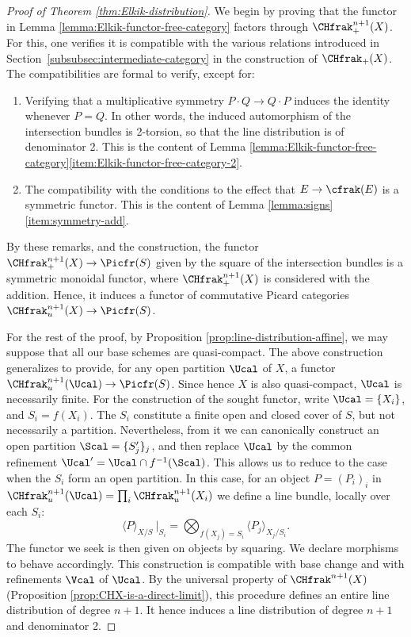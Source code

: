 \begin{proof}[Proof of Theorem \ref{thm:Elkik-distribution}]
We begin by proving that the functor in Lemma \ref{lemma:Elkik-functor-free-category} factors through $\CHfrak_{+}^{n+1}(X)$. For this, one verifies it is compatible with the various relations introduced in Section~\ref{subsubsec:intermediate-category} in the construction of $\CHfrak_{+}(X)$. The compatibilities are formal to verify, except for:
\begin{enumerate}
\item Verifying that a multiplicative symmetry $P\cdot Q\to Q\cdot P$ induces the identity whenever $P = Q$. In other words, the induced automorphism of the intersection bundles is 2-torsion, so that the line distribution is of denominator 2. This is the content of Lemma \ref{lemma:Elkik-functor-free-category}\eqref{item:Elkik-functor-free-category-2}.
\item The compatibility with the conditions to the effect that $E\to\cfrak(E)$ is a symmetric functor. This is the content of Lemma \ref{lemma:signs}\eqref{item:symmetry-add}.
\end{enumerate}
By these remarks, and the construction, the functor $\CHfrak_{+}^{n+1}(X)\to\Picfr(S)$ given by the square of the intersection bundles is a symmetric monoidal functor, where $\CHfrak_{+}^{n+1}(X)$ is considered with the addition. Hence, it induces a functor of commutative Picard categories $\CHfrak_{u}^{n+1}(X)\to\Picfr(S)$.

For the rest of the proof, by Proposition \ref{prop:line-distribution-affine}, we may suppose that all our base schemes are quasi-compact. The above construction generalizes to provide, for any open partition $\Ucal$ of $X$, a functor $\CHfrak_{u}^{n+1}(\Ucal)\to\Picfr(S)$. Since hence $X$ is also quasi-compact, $\Ucal$ is necessarily finite. For the construction of the sought functor, write $\Ucal=\lbrace X_{i}\rbrace$, and $S_{i}=f(X_{i})$. The $S_{i}$ constitute a finite open and closed cover of $S$, but not necessarily a partition. Nevertheless, from it we can canonically construct an open partition $\Scal = \lbrace S_{j}^{\prime}\rbrace_{j}$, and then replace $\Ucal$ by the common refinement $\Ucal'=\Ucal \cap f^{-1}(\Scal)$. This allows us to reduce to the case when the $S_{i}$ form an open partition. In this case, for an object $P=(P_{i})_i$ in $\CHfrak_{u}^{n+1}(\Ucal)=\prod_{i}\CHfrak_{u}^{n+1}(X_{i})$ we define a line bundle, locally over each $S_{i}$:
\begin{displaymath}
\langle P \rangle_{X/S}\ |_{S_{i}} = \bigotimes_{f(X_{j}) = S_{i} } \langle P_{j}\rangle_{X_{j}/S_{i}}.
\end{displaymath}
The functor we seek is then given on objects by squaring. We declare morphisms to behave accordingly. This construction is compatible with base change and with refinements $\Vcal$ of $\Ucal$. By the universal property of $\CHfrak^{n+1}(X)$ (\cf Proposition \ref{prop:CHX-is-a-direct-limit}), this procedure defines an entire line distribution of degree $n+1$. It hence induces a line distribution of degree $n+1$ and denominator 2.
\end{proof}

